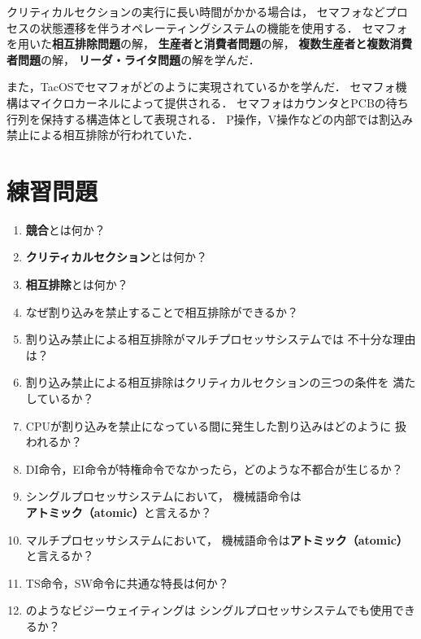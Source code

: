 クリティカルセクションの実行に長い時間がかかる場合は，
セマフォなどプロセスの状態遷移を伴うオペレーティングシステムの機能を使用する．
セマフォを用いた{\bf 相互排除問題}の解，
{\bf 生産者と消費者問題}の解，
{\bf 複数生産者と複数消費者問題}の解，
{\bf リーダ・ライタ問題}の解を学んだ．

また，TacOSでセマフォがどのように実現されているかを学んだ．
セマフォ機構はマイクロカーネルによって提供される．
セマフォはカウンタとPCBの待ち行列を保持する構造体として表現される．
P操作，V操作などの内部では割込み禁止による相互排除が行われていた．

\section*{練習問題}
\begin{enumerate}
\renewcommand{\labelenumi}{\tt \arabic{chapter}.\arabic{enumi}}
 \setlength{\leftskip}{1em}

\item {\bf 競合}とは何か？

\item {\bf クリティカルセクション}とは何か？

\item {\bf 相互排除}とは何か？

\item なぜ割り込みを禁止することで相互排除ができるか？

\item 割り込み禁止による相互排除がマルチプロセッサシステムでは
不十分な理由は？

\item 割り込み禁止による相互排除はクリティカルセクションの三つの条件を
満たしているか？

\item CPUが割り込みを禁止になっている間に発生した割り込みはどのように
扱われるか？

\item DI命令，EI命令が特権命令でなかったら，どのような不都合が生じるか？

\item シングルプロセッサシステムにおいて，
機械語命令は{\bf アトミック（atomic）}と言えるか？

\item マルチプロセッサシステムにおいて，
機械語命令は{\bf アトミック（atomic）}と言えるか？

\item TS命令，SW命令に共通な特長は何か？

\item {}のようなビジーウェイティングは
シングルプロセッサシステムでも使用できるか？


\end{enumerate}
